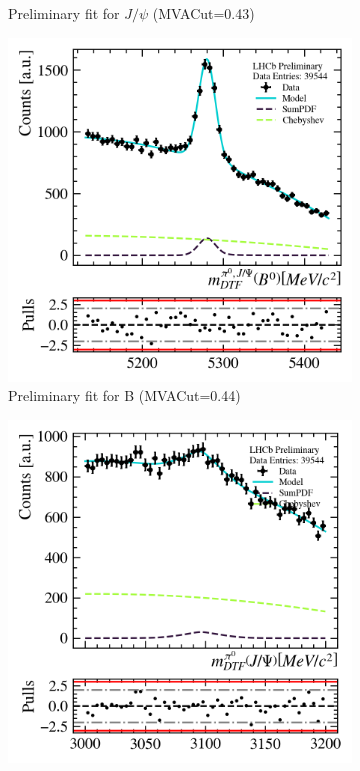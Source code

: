 \begin{figure}
\begin{subfigure}{0.49\textwidth}
        \caption*{Preliminary fit for $J/\psi$ (MVACut=0.43)}
        \label{fig:prefit_mvascan_mvacut040_b}
    \end{subfigure}
    \begin{subfigure}{0.49\textwidth}
        \includegraphics[width=\textwidth]{./OutputFiles/PNGPlots/PreliminaryFit/MVAScan/b1dfit_mva0.44_jpsichannel.png}
        \caption*{Preliminary fit for B (MVACut=0.44)}
        \label{fig:prefit_mvascan_mvacut040_b}
    \end{subfigure}
    \begin{subfigure}{0.49\textwidth}
        \includegraphics[width=\textwidth]{./OutputFiles/PNGPlots/PreliminaryFit/MVAScan/jpsi1dfit_mva0.44_jpsichannel.png}

\end{subfigure}
\end{figure}
